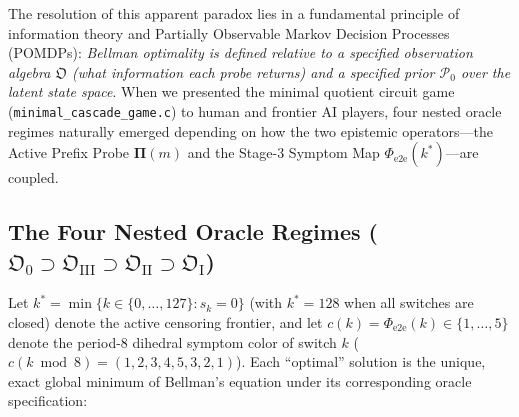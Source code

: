 \documentclass[11pt,a4paper]{article}
\theoremstyle{definition}
\theoremstyle{remark}
\begin{document}
The resolution of this apparent paradox lies in a fundamental principle of information theory and Partially Observable Markov Decision Processes (POMDPs): \emph{Bellman optimality is defined relative to a specified observation algebra $\mathfrak{O}$ (what information each probe returns) and a specified prior $\mathcal{P}_0$ over the latent state space}. When we presented the minimal quotient circuit game (\texttt{minimal\_cascade\_game.c}) to human and frontier AI players, four nested oracle regimes naturally emerged depending on how the two epistemic operators---the Active Prefix Probe $\bm{\Pi}(m)$ and the Stage-3 Symptom Map $\Phi_{\text{e2e}}(k^*)$---are coupled.

\subsection{The Four Nested Oracle Regimes ($\mathfrak{O}_0 \supset \mathfrak{O}_{\text{III}} \supset \mathfrak{O}_{\text{II}} \supset \mathfrak{O}_{\text{I}}$)}

Let $k^* = \min\{k \in \{0,\dots,127\} : s_k = 0\}$ (with $k^* = 128$ when all switches are closed) denote the active censoring frontier, and let $c(k) = \Phi_{\text{e2e}}(k) \in \{1,\dots,5\}$ denote the period-8 dihedral symptom color of switch $k$ ($c(k \bmod 8) = (1, 2, 3, 4, 5, 3, 2, 1)$). Each ``optimal'' solution is the unique, exact global minimum of Bellman's equation under its corresponding oracle specification:
\end{document}
